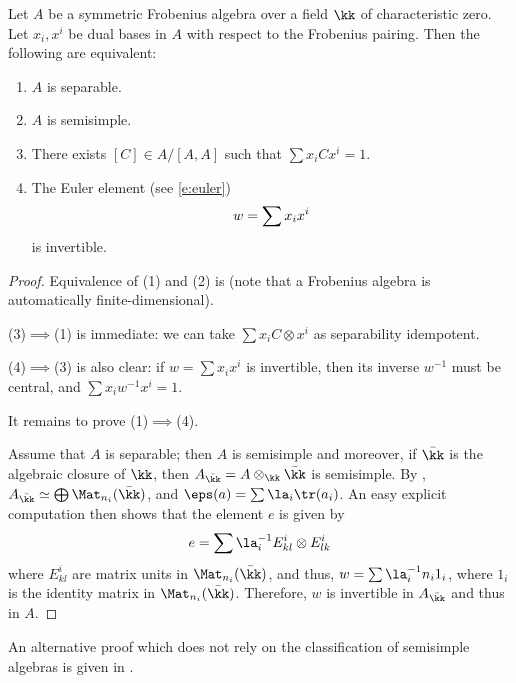 \begin{theorem}\label{t:separable-frobenius}
  Let $A$ be a symmetric Frobenius algebra over a field $\kk$ of characteristic
  zero. Let $x_i, x^i$ be dual bases in $A$ with respect to the Frobenius
  pairing. Then the following are equivalent:
  \begin{enumerate}
    \item $A$ is separable.
    \item $A$ is semisimple.
    \item There exists $[C]\in A/[A,A]$ such that $\sum x_iCx^i=1$.
    \item The Euler element \textup{(}see \eqref{e:euler}\textup{)}
      \begin{equation}\label{e:euler2}\index{Euler element}
        w=\sum x_ix^i
      \end{equation}
      is invertible.
  \end{enumerate}
\end{theorem}
\begin{proof}
  Equivalence of (1) and (2) is 
  (note that a Frobenius algebra is automatically finite-dimensional).

  (3)$\implies$(1) is immediate: we can take $\sum x_i C\otimes x^i$ as
  separability idempotent.

  (4)$\implies$(3) is also clear: if $w=\sum x_i x^i$ is invertible, then its
  inverse $w^{-1}$ must be central, and $\sum x_i w^{-1} x^i=1$.

  It remains to prove (1)$\implies$(4).

  Assume that $A$ is separable; then $A$ is semisimple and moreover, if
  $\bar \kk$ is the algebraic closure of $\kk$, then
  $A_{\bar \kk}=A\otimes_\kk \bar\kk$ is semisimple. By
  , $A_{\bar\kk}\simeq\bigoplus \Mat_{n_i}(\bar \kk)$,
  and $\eps(a)=\sum \la_i \tr(a_i)$.
  An easy explicit computation then shows that the element $e$ is given by
  $$
    e = \sum \la_i^{-1}E^i_{kl}\otimes E^i_{lk}
  $$
  where $E^i_{kl}$ are matrix units in $\Mat_{n_i}(\bar \kk)$,
  and thus, $w=\sum \la_i^{-1} n_i 1_i$, where $1_i$ is the identity matrix in
  $\Mat_{n_i}(\bar \kk)$. Therefore, $w$ is invertible in $A_{\bar \kk}$
  and thus in $A$.
\end{proof}
\begin{remark}
  An alternative proof which does not rely on the classification of
  semisimple algebras is given in \cite[Theorem 2.14]{lauda-pfeiffer}.
\end{remark}

